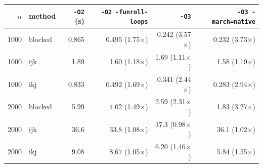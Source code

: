 \begin{tabular}{rlrrrr}
\toprule
$n$ & method & \texttt{-O2} (s) & \texttt{-O2 -funroll-loops} & \texttt{-O3} & \texttt{-O3 -march=native} \\
\midrule
1000 & blocked & 0.865 & 0.495 (1.75$\times$) & 0.242 (3.57$\times$) & 0.232 (3.73$\times$) \\
1000 & ijk & 1.89 & 1.60 (1.18$\times$) & 1.69 (1.11$\times$) & 1.58 (1.19$\times$) \\
1000 & ikj & 0.833 & 0.492 (1.69$\times$) & 0.341 (2.44$\times$) & 0.283 (2.94$\times$) \\
2000 & blocked & 5.99 & 4.02 (1.49$\times$) & 2.59 (2.31$\times$) & 1.83 (3.27$\times$) \\
2000 & ijk & 36.6 & 33.8 (1.08$\times$) & 37.3 (0.98$\times$) & 36.1 (1.02$\times$) \\
2000 & ikj & 9.08 & 8.67 (1.05$\times$) & 6.20 (1.46$\times$) & 5.84 (1.55$\times$) \\
\bottomrule
\end{tabular}
